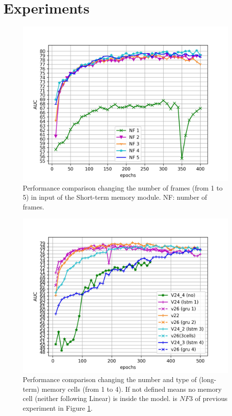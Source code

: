 \section{Experiments}
\label{sec:experiments}

\begin{figure}[t]
\centering
	\includegraphics[trim=0 0 0 0, clip, width=1.\linewidth]{images/exp_1.jpg}
	\caption{Performance comparison changing the number of frames (from 1 to 5) in input of the Short-term memory module. NF: number of frames. }
	\label{fig:num-frames-vst}
\end{figure}

\begin{figure}[t]
\centering
	\includegraphics[trim=0 0 0 0, clip, width=1.\linewidth]{images/exp_2.jpg}
	\caption{Performance comparison changing the number and type of (long-term) memory cells (from 1 to 4). If not defined means no memory cell (neither following Linear) is inside the model.  is $NF 3$ of previous experiment in Figure \ref{fig:num-frames-vst}.}
	\label{fig:num-memory-cells}
\end{figure}

